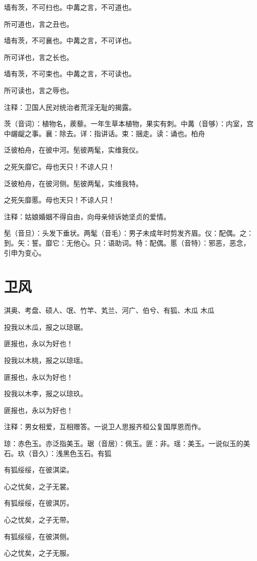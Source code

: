 \documentclass[12pt,UTF8]{ctexbook}
\begin{document}
墙有茨，不可扫也。中冓之言，不可道也。

所可道也，言之丑也。

墙有茨，不可襄也。中冓之言，不可详也。

所可详也，言之长也。

墙有茨，不可束也。中冓之言，不可读也。

所可读也，言之辱也。

注释：卫国人民对统治者荒淫无耻的揭露。

茨（音词）：植物名，蒺藜。一年生草本植物，果实有刺。中冓（音够）：内室，宫中龌龊之事。襄：除去。详：指讲话。束：捆走。读：诵也。柏舟

泛彼柏舟，在彼中河。髧彼两髦，实维我仪。

之死矢靡它。母也天只！不谅人只！

泛彼柏舟，在彼河侧。髧彼两髦，实维我特。

之死矢靡慝。母也天只！不谅人只！

注释：姑娘婚姻不得自由，向母亲倾诉她坚贞的爱情。

髧（音旦）：头发下垂状。两髦（音毛）：男子未成年时剪发齐眉。仪：配偶。之：到。矢：誓。靡它：无他心。只：语助词。特：配偶。慝（音特）：邪恶，恶念，引申为变心。



\part{卫风}
淇奥、考盘、硕人、氓、竹竿、芄兰、河广、伯兮、有狐、木瓜
木瓜

投我以木瓜，报之以琼琚。

匪报也，永以为好也！

投我以木桃，报之以琼瑶。

匪报也，永以为好也！

投我以木李，报之以琼玖。

匪报也，永以为好也！

注释：男女相爱，互相赠答。一说卫人思报齐桓公复国厚恩而作。

琼：赤色玉。亦泛指美玉。琚（音居）：佩玉。匪：非。瑶：美玉。一说似玉的美石。玖（音久）：浅黑色玉石。有狐

有狐绥绥，在彼淇梁。

心之忧矣，之子无裳。

有狐绥绥，在彼淇厉。

心之忧矣，之子无带。

有狐绥绥，在彼淇侧。

心之忧矣，之子无服。
\end{document}
